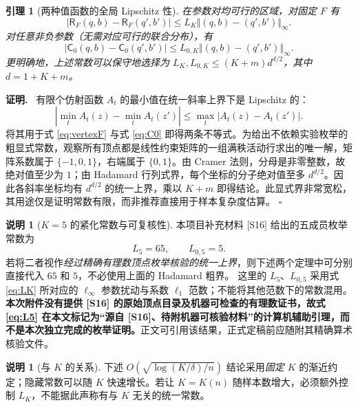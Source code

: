 \documentclass[11pt,a4paper]{ctexart}
\newtheorem{lemma}[theorem]{引理}
\theoremstyle{definition}
\newtheorem{remark}[theorem]{说明}
\newenvironment{proofcn}{\par\noindent\textbf{证明.}\ }{\hfill$\square$\par}
\newcommand{\Rsk}{\mathsf R}
\newcommand{\CGraph}{\mathsf C_0}
\begin{document}
\begin{lemma}[两种值函数的全局 Lipschitz 性]\label{lem:lip}
在参数对均可行的区域，对固定 $F$ 有
\begin{equation}\label{eq:LipF}
|\Rsk_F(q,b)-\Rsk_F(q',b')|\le L_K\Vert(q,b)-(q',b')\Vert_\infty.
\end{equation}
对任意非负参数（无需对应可行的联合分布），有
\begin{equation}\label{eq:LipC}
|\CGraph(q,b)-\CGraph(q',b')|\le L_{0,K}\Vert(q,b)-(q',b')\Vert_\infty.
\end{equation}
更明确地，上述常数可以保守地选择为 $L_K,L_{0,K}\le (K+m)d^{d/2}$，其中 $d=1+K+m$。
\end{lemma}
\begin{proofcn}
有限个仿射函数 $A_t$ 的最小值在统一斜率上界下是 Lipschitz 的：
\[|\min_tA_t(z)-\min_tA_t(z')|\le\max_t|A_t(z)-A_t(z')|.\]
将其用于式 \eqref{eq:vertexF} 与式 \eqref{eq:C0} 即得两条不等式。为给出不依赖实验枚举的粗显式常数，观察所有顶点都是线性约束矩阵的一组满秩活动行求出的唯一解，矩阵系数属于 $\{-1,0,1\}$，右端属于 $\{0,1\}$。由 Cramer 法则，分母是非零整数，故绝对值至少为 $1$；由 Hadamard 行列式界，每个坐标的分子绝对值至多 $d^{d/2}$。因此各斜率坐标均有 $d^{d/2}$ 的统一上界，乘以 $K+m$ 即得结论。此显式界非常宽松，其用途仅是证明常数有限，而非推荐直接用于样本复杂度估算。
\end{proofcn}


\begin{remark}[$K=5$ 的紧化常数与可复核性]\label{rem:L5}
本项目补充材料 [S16] 给出的五成员枚举常数为
\begin{equation}\label{eq:L5}
L_5=65,\qquad L_{0,5}=5.
\end{equation}
若将二者视作\emph{经过精确有理数顶点枚举核验的统一上界}，则下述两个定理中可分别直接代入 $65$ 和 $5$，不必使用上面的 Hadamard 粗界。
这里的 $L_5$、$L_{0,5}$ 采用式 \eqref{eq:LK} 所对应的 $\ell_\infty$ 参数扰动与系数 $\ell_1$ 范数；不能将其他范数下的常数混用。\textbf{本次附件没有提供 [S16] 的原始顶点目录及机器可检查的有理数证书，故式 \eqref{eq:L5} 在本文标记为“源自 [S16]、待附机器可核验材料”的计算机辅助引理，而不是本次独立完成的枚举证明。}正文可引用该结果，正式定稿前应随附其精确算术核验文件。
\end{remark}

\begin{remark}[与 $K$ 的关系]
下述 $O(\sqrt{\log(K/\delta)/n})$ 结论采用\emph{固定 $K$} 的渐近约定；隐藏常数可以随 $K$ 快速增长。若让 $K=K(n)$ 随样本数增大，必须额外控制 $L_K$，不能据此声称有与 $K$ 无关的统一常数。
\end{remark}
\end{document}
